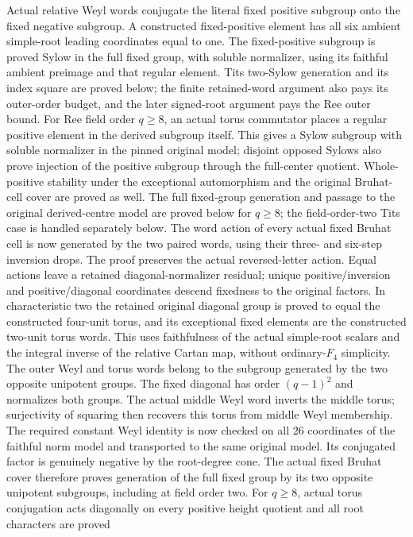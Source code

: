 Actual relative Weyl words conjugate the literal fixed positive subgroup
onto the fixed negative subgroup. A constructed fixed-positive element
has all six ambient simple-root leading coordinates equal to one.
The fixed-positive subgroup is proved Sylow in the full fixed group,
with soluble normalizer, using its faithful ambient preimage and that
regular element. Tits two-Sylow generation and its index square are
proved below; the finite retained-word argument also pays its outer-order
budget, and the later signed-root argument pays the Ree outer bound.
For Ree field order $q\geq8$, an actual torus commutator places a
regular positive element in the derived subgroup itself. This gives a
Sylow subgroup with soluble normalizer in the pinned original model;
disjoint opposed Sylows also prove injection of the positive subgroup
through the full-center quotient. Whole-positive stability under the
exceptional automorphism and the original Bruhat-cell cover are proved
as well. The full fixed-group generation and passage to the original
derived-centre model are proved below for $q\geq8$; the field-order-two
Tits case is handled separately below.
The word action of every actual fixed Bruhat cell is now generated by
the two paired words, using their three- and six-step inversion drops.
The proof preserves the actual reversed-letter action. Equal actions
leave a retained diagonal-normalizer residual; unique positive/inversion
and positive/diagonal coordinates descend fixedness to the original
factors. In characteristic two the retained original diagonal group is
proved to equal the constructed four-unit torus, and its exceptional
fixed elements are the constructed two-unit torus words. This uses
faithfulness of the actual simple-root scalars and the integral inverse
of the relative Cartan map, without ordinary-$F_4$ simplicity.
The outer Weyl and torus words belong to the subgroup generated by the
two opposite unipotent groups. The fixed diagonal has order $(q-1)^2$
and normalizes both groups. The actual middle Weyl word inverts the middle
torus; surjectivity of squaring then recovers this torus from middle
Weyl membership. The required constant Weyl identity is now checked on
all 26 coordinates of the faithful norm model and transported to the
same original model. Its conjugated factor is genuinely negative by the
root-degree cone. The actual fixed Bruhat cover therefore proves generation
of the full fixed group by its two opposite unipotent subgroups, including
at field order two. For $q\geq8$, actual torus conjugation acts diagonally
on every positive height quotient and all root characters are proved
